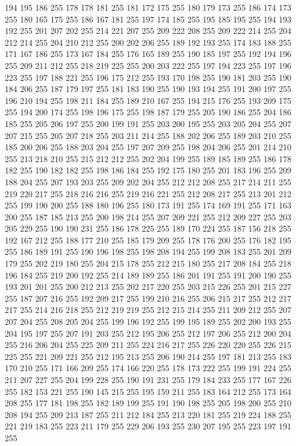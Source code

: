 194 195 186 255 178 178 181 255 181 172 175 255 180 179 173 255 186 174 173 255 180 165 175 255 186 167 181 255 197 174 185 255 195 185 195 255 194 193 192 255 201 207 202 255 214 221 207 255 209 222 208 255 209 222 214 255 204 212 214 255 204 210 212 255
200 202 206 255 189 192 193 255 174 183 188 255 171 167 186 255 173 167 184 255 176 165 189 255 190 185 197 255 192 194 196 255 209 211 212 255 218 219 225 255 200 203 222 255 197 194 223 255 197 196 223 255 197 188 221 255 196 175 212 255 193 170 198 255
190 181 203 255 190 184 206 255 187 179 197 255 181 183 190 255 190 193 194 255 191 200 197 255 196 210 194 255 198 211 184 255 189 210 167 255 194 215 176 255 193 209 175 255 194 200 174 255 198 196 175 255 198 187 179 255 205 190 186 255 204 186 185 255
205 206 197 255 200 199 191 255 203 200 195 255 203 205 204 255 207 207 215 255 205 207 218 255 203 211 214 255 188 202 206 255 189 203 210 255 185 200 206 255 188 203 204 255 197 207 209 255 198 204 206 255 201 214 210 255 213 218 210 255 215 212 212 255
202 204 199 255 189 185 189 255 186 178 182 255 190 182 182 255 198 186 184 255 192 175 180 255 201 183 196 255 209 188 204 255 207 193 203 255 209 202 204 255 212 212 208 255 217 214 211 255 219 220 217 255 218 216 216 255 219 216 221 255 212 208 217 255
213 201 212 255 199 190 200 255 188 180 196 255 180 173 191 255 174 169 191 255 171 163 200 255 187 185 213 255 200 198 214 255 207 209 221 255 212 209 227 255 203 205 229 255 190 190 231 255 186 178 225 255 189 170 224 255 187 156 218 255 192 167 212 255
188 177 210 255 185 179 209 255 178 176 200 255 176 182 195 255 186 189 191 255 190 196 198 255 198 208 194 255 199 208 183 255 201 209 179 255 202 219 180 255 204 215 178 255 212 215 180 255 217 208 184 255 218 196 184 255 219 200 192 255 214 189 189 255
186 201 191 255 191 200 190 255 193 201 201 255 200 212 213 255 202 217 220 255 203 215 226 255 201 215 227 255 187 207 216 255 192 209 217 255 199 210 216 255 206 215 217 255 212 217 217 255 214 216 218 255 212 219 219 255 212 215 214 255 211 209 212 255
207 207 204 255 208 205 204 255 199 196 192 255 199 195 189 255 202 200 193 255 204 195 197 255 207 191 203 255 212 195 206 255 212 197 206 255 212 200 204 255 216 206 204 255 225 209 211 255 224 216 217 255 226 220 220 255 226 215 225 255 221 209 221 255
212 195 213 255 206 190 214 255 197 181 213 255 183 170 210 255 171 166 209 255 174 166 220 255 178 173 222 255 199 191 224 255 211 207 227 255 204 199 228 255 190 191 231 255 179 184 233 255 177 167 226 255 182 153 221 255 190 145 215 255 195 159 211 255
183 164 212 255 173 164 208 255 177 181 198 255 182 189 199 255 191 190 198 255 205 198 200 255 210 208 194 255 209 213 187 255 211 212 184 255 213 220 181 255 219 224 188 255 221 219 183 255 223 211 179 255 229 206 193 255 230 207 195 255 223 197 191 255
